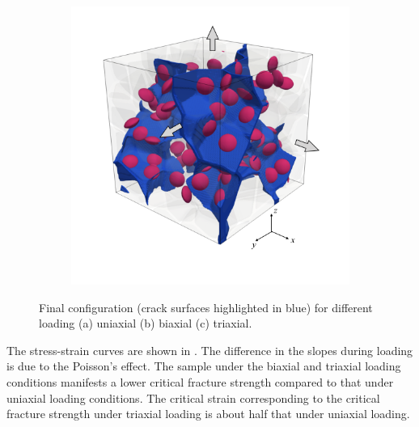 \begin{figure}[!htb]
\begin{subfigure}{0.32\textwidth}
    \caption{}
    \label{b100_load2}
  \end{subfigure}
  \begin{subfigure}{0.32\textwidth}
    \centering
    \includegraphics[width=\textwidth]{Chapter3/figures/b100_end_xyz}
    \caption{}
    \label{b100_load3}
  \end{subfigure}
  \caption{ Final configuration (crack surfaces highlighted in blue) for different loading (a) uniaxial (b) biaxial (c) triaxial.}
  \label{final_loading}
\end{figure}

The stress-strain curves are shown in . The difference in the slopes during loading is due to the Poisson's effect. The sample under the biaxial and triaxial loading conditions manifests a lower critical fracture strength compared to that under uniaxial loading conditions. The critical strain corresponding to the critical fracture strength under triaxial loading is about half that under uniaxial loading.

